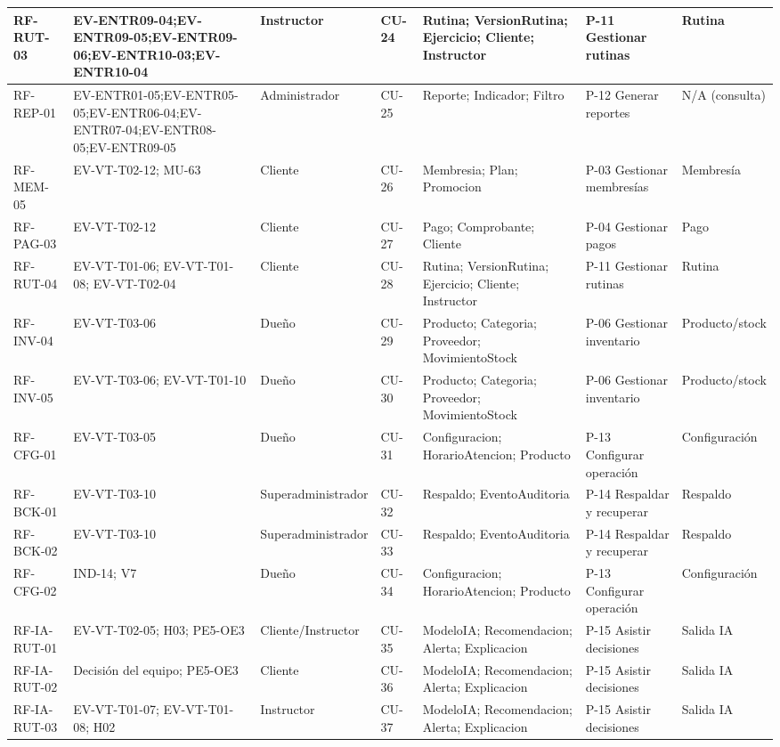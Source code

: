\begin{landscape}
\begin{longtable}{|p{1.8cm}|p{3.4cm}|p{2.0cm}|p{1.4cm}|p{5.0cm}|p{4.0cm}|p{3.2cm}|}
RF-RUT-03 & EV-ENTR09-04;EV-ENTR09-05;EV-ENTR09-06;EV-ENTR10-03;EV-ENTR10-04 & Instructor & CU-24 & Rutina; VersionRutina; Ejercicio; Cliente; Instructor & P-11 Gestionar rutinas & Rutina \\ \hline
RF-REP-01 & EV-ENTR01-05;EV-ENTR05-05;EV-ENTR06-04;EV-ENTR07-04;EV-ENTR08-05;EV-ENTR09-05 & Administrador & CU-25 & Reporte; Indicador; Filtro & P-12 Generar reportes & N/A (consulta) \\ \hline
RF-MEM-05 & EV-VT-T02-12; MU-63 & Cliente & CU-26 & Membresia; Plan; Promocion & P-03 Gestionar membresías & Membresía \\ \hline
RF-PAG-03 & EV-VT-T02-12 & Cliente & CU-27 & Pago; Comprobante; Cliente & P-04 Gestionar pagos & Pago \\ \hline
RF-RUT-04 & EV-VT-T01-06; EV-VT-T01-08; EV-VT-T02-04 & Cliente & CU-28 & Rutina; VersionRutina; Ejercicio; Cliente; Instructor & P-11 Gestionar rutinas & Rutina \\ \hline
RF-INV-04 & EV-VT-T03-06 & Dueño & CU-29 & Producto; Categoria; Proveedor; MovimientoStock & P-06 Gestionar inventario & Producto/stock \\ \hline
RF-INV-05 & EV-VT-T03-06; EV-VT-T01-10 & Dueño & CU-30 & Producto; Categoria; Proveedor; MovimientoStock & P-06 Gestionar inventario & Producto/stock \\ \hline
RF-CFG-01 & EV-VT-T03-05 & Dueño & CU-31 & Configuracion; HorarioAtencion; Producto & P-13 Configurar operación & Configuración \\ \hline
RF-BCK-01 & EV-VT-T03-10 & Superadministrador & CU-32 & Respaldo; EventoAuditoria & P-14 Respaldar y recuperar & Respaldo \\ \hline
RF-BCK-02 & EV-VT-T03-10 & Superadministrador & CU-33 & Respaldo; EventoAuditoria & P-14 Respaldar y recuperar & Respaldo \\ \hline
RF-CFG-02 & IND-14; V7 & Dueño & CU-34 & Configuracion; HorarioAtencion; Producto & P-13 Configurar operación & Configuración \\ \hline
RF-IA-RUT-01 & EV-VT-T02-05; H03; PE5-OE3 & Cliente/Instructor & CU-35 & ModeloIA; Recomendacion; Alerta; Explicacion & P-15 Asistir decisiones & Salida IA \\ \hline
RF-IA-RUT-02 & Decisión del equipo; PE5-OE3 & Cliente & CU-36 & ModeloIA; Recomendacion; Alerta; Explicacion & P-15 Asistir decisiones & Salida IA \\ \hline
RF-IA-RUT-03 & EV-VT-T01-07; EV-VT-T01-08; H02 & Instructor & CU-37 & ModeloIA; Recomendacion; Alerta; Explicacion & P-15 Asistir decisiones & Salida IA \\ \hline

\end{longtable}
\end{landscape}
